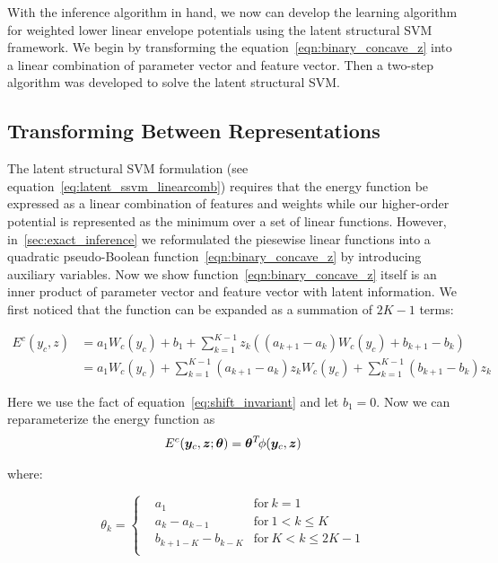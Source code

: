 With the inference algorithm in hand, we now can develop the
learning algorithm for weighted lower linear envelope potentials
using the latent structural SVM framework. We begin by
transforming the equation~\eqref{eqn:binary_concave_z} into a
linear combination of parameter vector and feature vector. Then a
two-step algorithm was developed to solve the latent structural
SVM.


\subsection{Transforming Between Representations}
\label{sec:latent_linEnv_represent}

The latent structural SVM formulation (see
equation~\eqref{eq:latent_ssvm_linearcomb}) requires that the
energy function be expressed as a linear combination of features
and weights while our higher-order potential is represented as
the minimum over a set of linear functions. However,
in~\ref{sec:exact_inference} we reformulated the piesewise linear
functions into a quadratic pseudo-Boolean
function~\eqref{eqn:binary_concave_z} by introducing auxiliary
variables. Now we show function~\eqref{eqn:binary_concave_z}
itself is an inner product of parameter vector and feature vector
with latent information. We first noticed that the function can
be expanded as a summation of $2K-1$ terms:

\begin{align}
  \label{eq:originalenergy}
  E^c(y_c,z)&=a_1W_c(y_c)+b_1+\sum_{k=1}^{K-1}z_k((a_{k+1}-a_k)W_c(y_c)+b_{k+1}-b_k)\nonumber\\ 
            &=a_1W_c(y_c)+\sum_{k=1}^{K-1}(a_{k+1}-a_k)z_kW_c(y_c)+\sum_{k=1}^{K-1}(b_{k+1}-b_k)z_k
\end{align}

Here we use the fact of equation~\eqref{eq:shift_invariant} and
let $b_1=0$. Now we can reparameterize the energy function
as
\begin{align}
  \label{eq:llsvm_innerprod_energy}
  E^c({\bm{y}}_c,{\bm{z}}; {\bm{\theta}}) = {\bm{\theta}}^T \! \phi({\bm{y}}_c,{\bm{z}})
\end{align}

\noindent where:

\begin{equation}
\label{eq:llsvm_param}
  \theta_k = \left\{
    \begin{aligned}
      & a_1	& \text{for} \ k=1\\
      & a_k-a_{k-1} & \text{for}\ 1< k \leq K\\
      & b_{k+1-K}-b_{k-K} & \text{for} \ K<k\le2K-1\\
    \end{aligned}
  \right.
\end{equation}

